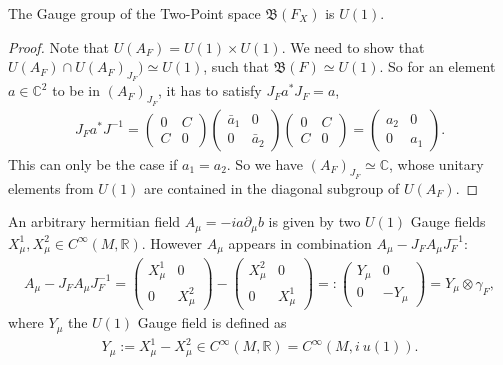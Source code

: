 \begin{proposition}
The Gauge group of the Two-Point space $\mathfrak{B}(F_X)$ is $U(1)$.
\end{proposition}
\begin{proof}
    Note that $U(A_F) = U(1) \times U(1)$. We need to show that $U(A_F) \cap
    U(A_F)_{J_F}) \simeq U(1)$, such that $\mathfrak{B}(F) \simeq U(1)$. So
    for an element $a \in \mathbb{C}^2$ to be in $(A_F)_{J_F}$, it has to
    satisfy $J_F a^* J_F = a$,
    \begin{align}
        J_F a^* J^{-1} =
        \begin{pmatrix}0&C\\C&0\end{pmatrix}
            \begin{pmatrix}\bar{a}_1&0\\0&\bar{a}_2\end{pmatrix}
        \begin{pmatrix}0&C\\C&0\end{pmatrix}
            =
            \begin{pmatrix}a_2&0\\0&a_1\end{pmatrix}.
    \end{align}
    This can only be the case if $a_1 = a_2$. So we have
    $(A_F)_{J_F} \simeq \mathbb{C}$, whose unitary elements
    from $U(1)$ are contained in the diagonal subgroup of
    $U(A_F)$.
\end{proof}

An arbitrary hermitian field $A_\mu = -ia\partial _\mu b$  is given by
two $U(1)$ Gauge fields $X_\mu^1, X_\mu^2 \in C^\infty(M, \mathbb{R})$.
However $A_\mu$ appears in combination $A_\mu - J_F A_\mu J_F^{-1}$:
\begin{align}
 A_\mu - J_F A_\mu J_F^{-1} =
    \begin{pmatrix}X_\mu^1&0\\0&X_\mu^2 \end{pmatrix}
        -
    \begin{pmatrix}X_\mu^2&0\\0&X_\mu^1 \end{pmatrix}
        =:
    \begin{pmatrix}Y_\mu&0\\0&-Y_\mu \end{pmatrix}
    = Y_\mu \otimes \gamma _F,
\end{align}
where $Y_\mu$ the $U(1)$ Gauge field is defined as
\begin{align}
    Y_\mu := X_\mu^1 - X_\mu^2 \in C^\infty(M, \mathbb{R}) = C^\infty(M,
    i\ u(1)).
\end{align}

